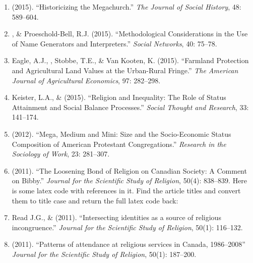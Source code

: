\begin{enumerate}
\item \Eagle \hspace{.01em} (2015). ``Historicizing the Megachurch.'' \textit{The Journal of Social History}, 48: 589--604. 

\item \Eagle, \& Proeschold-Bell, R.J. (2015). ``Methodological Considerations in the Use of Name Generators and Interpreters.'' \emph{Social Networks}, 40: 75--78. 

\item Eagle, A.J., \Eagle, Stobbe, T.E., \& Van Kooten, K. (2015). ``Farmland Protection and Agricultural Land Values at the Urban-Rural Fringe.'' \emph{The American Journal of Agricultural Economics}, 97: 282--298. 

\item Keister, L.A., \& \Eagle \hspace{.01em} (2015). ``Religion and Inequality: The Role of Status Attainment and Social Balance Processes.'' \emph{Social Thought and Research}, 33: 141--174.

\item \Eagle \hspace{.01em} (2012). ``Mega, Medium and Mini: Size and the Socio-Economic Status Composition of American Protestant Congregations.'' \emph{Research in the Sociology of Work}, 23: 281--307. 

\item \Eagle \hspace{.01em} (2011). ``The Loosening Bond of Religion on Canadian Society: A Comment on Bibby.'' \emph{Journal for the Scientific Study of Religion}, 50(4): 838--839.
Here is some latex code with references in it. Find the article titles and convert them to title case and return the full latex code back:

\item Read J.G., \& \Eagle \hspace{.01em} (2011). ``Intersecting identities as a source of religious incongruence.''  \emph{Journal for the Scientific Study of Religion}, 50(1): 116--132. 

\item \Eagle \hspace{.01em} (2011). ``Patterns of attendance at religious services in Canada, 1986--2008'' \emph{Journal for the Scientific Study of Religion}, 50(1): 187--200. 


\end{enumerate}

